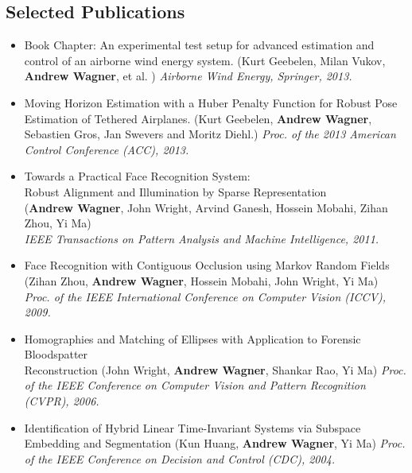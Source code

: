 \documentclass[line,lm,rm,11pt]{res} %
\def\spaceline{\vspace{1mm} \fullline}
\begin{document}
\begin{resume}
\section{Selected Publications}
\begin{itemize}
	\item 
		\spaceline
		Book Chapter: An experimental test setup for advanced estimation and control of an airborne wind energy system. 
		(Kurt Geebelen, Milan Vukov, {\bf Andrew Wagner}, et al. )
		{\it Airborne Wind Energy, Springer, 2013.}
	\item 
		Moving Horizon Estimation with a Huber Penalty Function for Robust Pose Estimation of Tethered Airplanes. 
		(Kurt Geebelen, {\bf Andrew Wagner}, Sebastien Gros, Jan Swevers and Moritz Diehl.) 
		{\it Proc. of the 2013 American Control Conference (ACC), 2013.}
	\item 
		Towards a Practical Face Recognition System: \\Robust Alignment and Illumination by Sparse Representation \\
		({\bf Andrew Wagner}, John Wright, Arvind Ganesh, Hossein Mobahi, Zihan Zhou, Yi Ma) \\
		{ \it IEEE Transactions on Pattern Analysis and Machine Intelligence, 2011. }
\item
		Face Recognition with Contiguous Occlusion using Markov Random Fields \\
			(Zihan Zhou, {\bf Andrew Wagner}, Hossein Mobahi, John Wright, Yi Ma) \\
		{\it Proc. of the IEEE International Conference on Computer Vision (ICCV), 2009.}
	\item Homographies and Matching of Ellipses with Application to Forensic Bloodspatter \\
		Reconstruction 
		(John Wright, {\bf Andrew Wagner}, {Shankar Rao},  Yi Ma) 
		{\it Proc. of the IEEE Conference on Computer Vision and Pattern Recognition (CVPR), 2006.}
	\item Identification of Hybrid Linear Time-Invariant Systems via Subspace Embedding and Segmentation (Kun Huang, {\bf Andrew Wagner}, Yi Ma) {\it Proc. of the IEEE Conference on Decision and Control (CDC), 2004.}
\end{itemize}

\end{resume}
\end{document}
